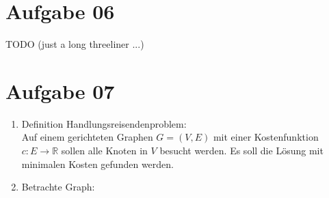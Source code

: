 \documentclass[10pt,a4paper]{article}
\begin{document}
\section*{Aufgabe 06}
    TODO (just a long threeliner ...)
    
\section*{Aufgabe 07}
    \begin{enumerate}[label={\alph*)}]
        \item Definition Handlungsreisendenproblem: \\
            Auf einem gerichteten Graphen $G = (V,E)$ mit einer
            Kostenfunktion $c: E \rightarrow \mathbb{R}$
            sollen alle Knoten in $V$ 
            besucht werden. Es soll die L\"osung mit minimalen Kosten
            gefunden werden.
        \item Betrachte Graph: \\
            \begin{figure}[H]
                \centering
                \def\svgwidth{\columnwidth}
\end{figure}
\end{enumerate}
\end{document}
